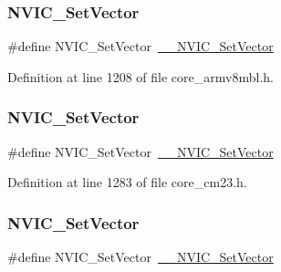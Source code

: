 \subsubsection{\texorpdfstring{N\+V\+I\+C\+\_\+\+Set\+Vector}{NVIC\_SetVector}\hspace{0.1cm}{\footnotesize\ttfamily [5/13]}}
{\footnotesize\ttfamily \#define N\+V\+I\+C\+\_\+\+Set\+Vector~\hyperlink{group___c_m_s_i_s___core___n_v_i_c_functions_ga0df355460bc1783d58f9d72ee4884208}{\+\_\+\+\_\+\+N\+V\+I\+C\+\_\+\+Set\+Vector}}



Definition at line 1208 of file core\+\_\+armv8mbl.\+h.

\mbox{\label{group___c_m_s_i_s___core___n_v_i_c_functions_ga804af63bb4c4c317387897431814775d}} 
\subsubsection{\texorpdfstring{N\+V\+I\+C\+\_\+\+Set\+Vector}{NVIC\_SetVector}\hspace{0.1cm}{\footnotesize\ttfamily [6/13]}}
{\footnotesize\ttfamily \#define N\+V\+I\+C\+\_\+\+Set\+Vector~\hyperlink{group___c_m_s_i_s___core___n_v_i_c_functions_ga0df355460bc1783d58f9d72ee4884208}{\+\_\+\+\_\+\+N\+V\+I\+C\+\_\+\+Set\+Vector}}



Definition at line 1283 of file core\+\_\+cm23.\+h.

\mbox{\label{group___c_m_s_i_s___core___n_v_i_c_functions_ga804af63bb4c4c317387897431814775d}} 
\subsubsection{\texorpdfstring{N\+V\+I\+C\+\_\+\+Set\+Vector}{NVIC\_SetVector}\hspace{0.1cm}{\footnotesize\ttfamily [7/13]}}
{\footnotesize\ttfamily \#define N\+V\+I\+C\+\_\+\+Set\+Vector~\hyperlink{group___c_m_s_i_s___core___n_v_i_c_functions_ga0df355460bc1783d58f9d72ee4884208}{\+\_\+\+\_\+\+N\+V\+I\+C\+\_\+\+Set\+Vector}}



